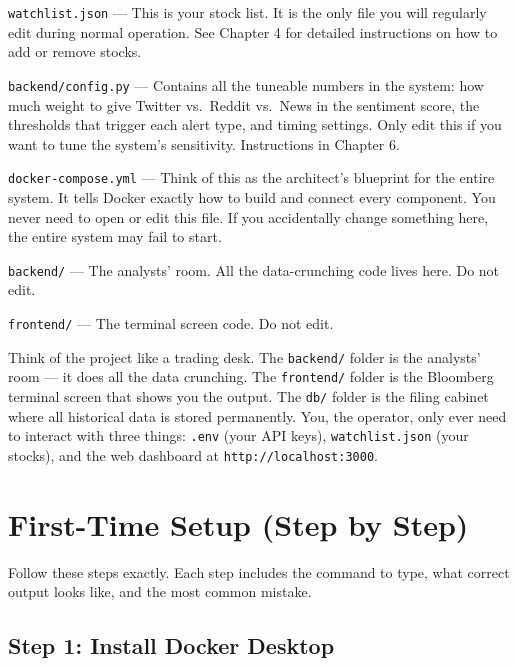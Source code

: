 \documentclass[12pt, a4paper]{report}
\begin{document}
\textcolor{imsEmerald}{\texttt{watchlist.json}} --- This is your stock list. It is the only file you will regularly edit during normal operation. See Chapter 4 for detailed instructions on how to add or remove stocks.

\textcolor{imsAmber}{\texttt{backend/config.py}} --- Contains all the tuneable numbers in the system: how much weight to give Twitter vs.\ Reddit vs.\ News in the sentiment score, the thresholds that trigger each alert type, and timing settings. Only edit this if you want to tune the system's sensitivity. Instructions in Chapter 6.

\textcolor{imsCrimson}{\texttt{docker-compose.yml}} --- Think of this as the architect's blueprint for the entire system. It tells Docker exactly how to build and connect every component. You never need to open or edit this file. If you accidentally change something here, the entire system may fail to start.

\textcolor{imsCrimson}{\texttt{backend/}} --- The analysts' room. All the data-crunching code lives here. Do not edit.

\textcolor{imsCrimson}{\texttt{frontend/}} --- The terminal screen code. Do not edit.

\begin{tipbox}
Think of the project like a trading desk. The \texttt{backend/} folder is the analysts' room --- it does all the data crunching. The \texttt{frontend/} folder is the Bloomberg terminal screen that shows you the output. The \texttt{db/} folder is the filing cabinet where all historical data is stored permanently. You, the operator, only ever need to interact with three things: \texttt{.env} (your API keys), \texttt{watchlist.json} (your stocks), and the web dashboard at \texttt{http://localhost:3000}.
\end{tipbox}

\chapter{First-Time Setup (Step by Step)}

Follow these steps exactly. Each step includes the command to type, what correct output looks like, and the most common mistake.

\section{Step 1: Install Docker Desktop}
\end{document}

